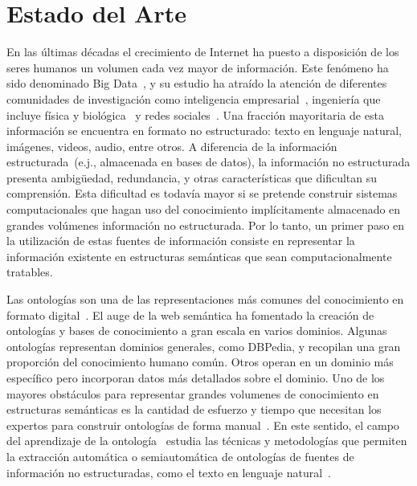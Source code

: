 \chapter{Estado del Arte}\label{Chapter:SOTA}

En las últimas décadas el crecimiento de Internet ha puesto a disposición de los seres humanos un volumen cada vez mayor de información.
Este fenómeno ha sido denominado Big Data~\cite{bigdata}, y su estudio ha atraído la atención de diferentes comunidades de investigación como inteligencia empresarial~\cite{chen2012business}, ingeniería que incluye física y biológica~\cite{wu2014data} y redes sociales~\cite{shah2015big}.
Una fracción mayoritaria de esta información se encuentra en formato no estructurado: texto en lenguaje natural, imágenes, videos, audio, entre otros.
A diferencia de la información estructurada~(e.j., almacenada en bases de datos), la información no estructurada presenta ambigüedad, redundancia, y otras características que dificultan su comprensión.
Esta dificultad es todavía mayor si se pretende construir sistemas computacionales que hagan uso del conocimiento implícitamente almacenado en grandes volúmenes información no estructurada.
Por lo tanto, un primer paso en la utilización de estas fuentes de información consiste en representar la información existente en estructuras semánticas que sean computacionalmente tratables.

Las ontologías son una de las representaciones más comunes del conocimiento en formato digital~\cite{guarino1995formal}.
El auge de la web semántica ha fomentado la creación de ontologías y bases de conocimiento a gran escala en varios dominios.
Algunas ontologías representan dominios generales, como DBPedia, y recopilan una gran proporción del conocimiento humano común.
Otros operan en un dominio más específico pero incorporan datos más detallados sobre el dominio.
Uno de los mayores obstáculos para representar grandes volumenes de conocimiento en estructuras semánticas es la cantidad de esfuerzo y tiempo que necesitan los expertos para construir ontologías de forma manual~\cite{gomez2006ontological, petasis2011ontology}.
En este sentido, el campo del aprendizaje de la ontología~\cite{buitelaar2005ontology} estudia las técnicas y metodologías que permiten la extracción automática o semiautomática de ontologías de fuentes de información no estructuradas, como el texto en lenguaje natural~\cite{mitchell2015never,Balahur2011}.

